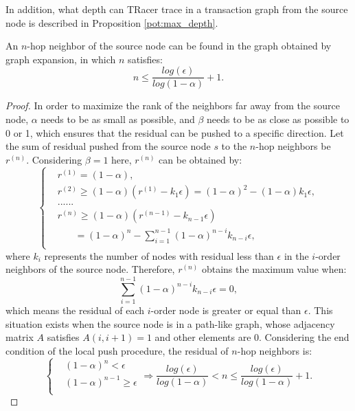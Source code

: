 In addition, what depth can TRacer trace in a transaction graph from the source node is described in Proposition \ref{pot:max_depth}.
\begin{proposition}
\label{pot:max_depth}
An $n$-hop neighbor of the source node can be found in the graph obtained by graph expansion, in which $n$ satisfies:
\begin{equation}
    n \leq \frac{log(\epsilon)}{log(1-\alpha)} + 1.
\end{equation}
\end{proposition}
\begin{proof}
In order to maximize the rank of the neighbors far away from the source node, $\alpha$ needs to be as small as possible, and $\beta$ needs to be as close as possible to 0 or 1, which ensures that the residual can be pushed to a specific direction.
Let the sum of residual pushed from the source node $s$ to the $n$-hop neighbors be $r^{(n)}$.
Considering $\beta=1$ here, $r^{(n)}$ can be obtained by:
\begin{equation}
    \begin{cases}
        & r^{(1)}=(1-\alpha), \\
        & r^{(2)} \geq (1-\alpha)(r^{(1)}-k_1 \epsilon)=(1-\alpha)^2-(1-\alpha)k_1 \epsilon, \\
        & ...... \\
        & r^{(n)} \geq (1-\alpha)(r^{(n-1)}-k_{n-1} \epsilon) \\
        & \ \ \ \ \ \ \ \ =(1-\alpha)^n-\sum\limits_{i=1}^{n-1}(1-\alpha)^{n-i}k_{n-i} \epsilon, \\
    \end{cases}
\end{equation}
where $k_i$ represents the number of nodes with residual less than $\epsilon$ in the $i$-order neighbors of the source node.
Therefore, $r^{(n)}$ obtains the maximum value when:
\begin{equation}
    \sum\limits_{i=1}^{n-1}(1-\alpha)^{n-i}k_{n-i} \epsilon = 0,
\end{equation}
which means the residual of each $i$-order node is greater or equal than $\epsilon$. 
This situation exists when the source node is in a path-like graph, whose adjacency matrix $A$ satisfies $A(i,i+1)=1$ and other elements are $0$.
Considering the end condition of the local push procedure, the residual of $n$-hop neighbors is:
\begin{equation}
\begin{cases}
    & (1-\alpha)^n < \epsilon\\
    & (1-\alpha)^{n-1} \geq \epsilon \\
\end{cases}
    \Rightarrow 
    \frac{log(\epsilon)}{log(1-\alpha)} < n \leq \frac{log(\epsilon)}{log(1-\alpha)} + 1.
\end{equation}
\end{proof}
